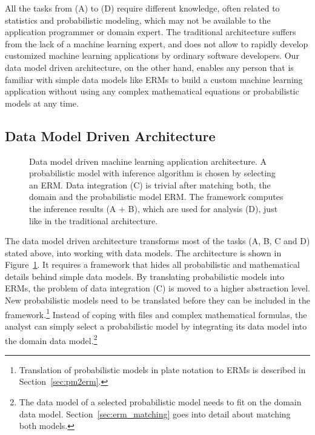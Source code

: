 All the tasks from (A) to (D) require different knowledge, often related to statistics and probabilistic modeling, which may not be available to the application programmer or domain expert. The traditional architecture suffers from the lack of a machine learning expert, and does not allow to rapidly develop customized machine learning applications by ordinary software developers. Our data model driven architecture, on the other hand, enables any person that is familiar with simple data models like ERMs to build a custom machine learning application without using any complex mathematical equations or probabilistic models at any time.

\newpage %

\subsection{Data Model Driven Architecture}

\begin{figure}
\centering
\scalebox{\tikzScale}{\adjustTikzSize }
\caption[Data model driven machine learning application architecture]{Data model driven machine learning application architecture. A probabilistic model with inference algorithm is chosen by selecting an ERM. Data integration (C) is trivial after matching both, the domain and the probabilistic model ERM. The framework computes the inference results (A + B), which are used for analysis (D), just like in the traditional architecture.}\label{fig:ml-application-architecture-dm}
\end{figure}

The data model driven architecture transforms most of the tasks (A, B, C and D) stated above, into working with data models. The architecture is shown in Figure~\ref{fig:ml-application-architecture-dm}. It requires a framework that hides all probabilistic and mathematical details behind simple data models. By translating probabilistic models into ERMs, the problem of data integration (C) is moved to a higher abstraction level. New probabilistic models need to be translated before they can be included in the framework.\footnote{Translation of probabilistic models in plate notation to ERMs is described in Section~\ref{sec:pm2erm}.} Instead of coping with files and complex mathematical formulas, the analyst can simply select a probabilistic model by integrating its data model into the domain data model.\footnote{The data model of a selected probabilistic model needs to fit on the domain data model. Section~\ref{sec:erm_matching} goes into detail about matching both models.}

